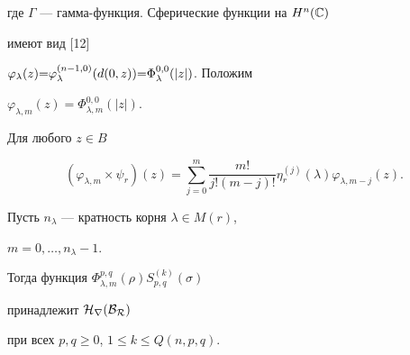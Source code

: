 где $\Gamma$ --- гамма-функция. Сферические функции на $H^n(\Bbb C)$ 


имеют вид [12] 


$\varphi_\lambda(z){=}\varphi^{(n-1,0)}_\lambda(d(0,z)){=}\linebreak


\Phi^{0,0}_\lambda(|z|)$. Положим 


$\varphi_{\lambda,m}(z)=\Phi^{0,0}_{\lambda,m}(|z|)$. 


 


\begin{lem} 


Для любого $z\in B$ 


\begin{equation} 


(\varphi_{\lambda,m}\times\psi_r)(z)=\sum^m_{j=0} 


\frac{m!}{j!(m-j)!}\eta^{(j)}_r(\lambda) 


\varphi_{\lambda,m-j}(z).


\end{equation} 


\end{lem} 


 


\begin{lem} 


Пусть $n_\lambda$ --- кратность корня $\lambda\in M(r)$, 


$m=0,\dotsc,n_\lambda-1$. 


Тогда функция $\Phi^{p,q}_{\lambda,m}(\rho)S^{(k)}_{p,q}(\sigma)$ 


принадлежит $\cal H_r(B_R)$ 


при всех $p,q\ge0$, $1\le k\le Q(n,p,q)$. 


\end{lem} 


 


